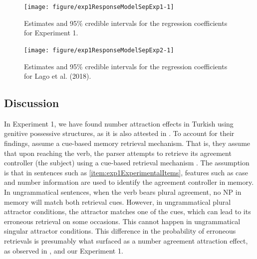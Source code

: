 \documentclass[doc,a4paper,man,natbib,floatsintext,noextraspace]{apa6}\usepackage[]{graphicx}\usepackage[]{color}
\newenvironment{knitrout}{}{} %
\begin{document}
\begin{knitrout}
\color{fgcolor}\begin{figure}

{\centering \texttt{[image: figure/exp1ResponseModelSepExp1-1]} 

}

\caption[Estimates and 95\% credible intervals for the regression coefficients for Experiment 1]{Estimates and 95\% credible intervals for the regression coefficients for Experiment 1.}\label{fig:exp1ResponseModelSepExp1}
\end{figure}


\end{knitrout}

\begin{knitrout}
\color{fgcolor}\begin{figure}

{\centering \texttt{[image: figure/exp1ResponseModelSepExp2-1]} 

}

\caption[Estimates and 95\% credible intervals for the regression coefficients for Lago et al]{Estimates and 95\% credible intervals for the regression coefficients for Lago et al. (2018).}\label{fig:exp1ResponseModelSepExp2}
\end{figure}


\end{knitrout}


\subsection{Discussion} \label{sec:exp1:discussion}

In Experiment 1, we have found number attraction effects in Turkish using genitive possessive structures, as it is also attested in \citet{LagoEtAl:2018}. To account for their findings, \citet{LagoEtAl:2018} assume a cue-based memory retrieval mechanism. That is, they assume that upon reaching the verb, the parser attempts to retrieve its agreement controller (the subject) using a cue-based retrieval mechanism \citep{LewisVasishth:2005,JagerEngelmannVasishth:2017}. The assumption is that in sentences such as \ref{item:exp1ExperimentalItems}, features such as case and number information are used to identify the agreement controller in memory. In ungrammatical sentences, when the verb bears plural agreement, no NP in memory will match both retrieval cues. However, in ungrammatical plural attractor conditions, the attractor matches one of the cues, which can lead to its erroneous retrieval on some occasions. This cannot happen in ungrammatical singular attractor conditions. This difference in the probability of erroneous retrievals is presumably what surfaced as a number agreement attraction effect, as observed in \citet{LagoEtAl:2018}, and our Experiment 1.
\end{document}

